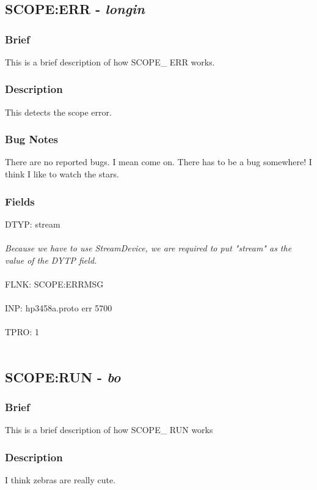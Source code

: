 \documentclass[12pt]{article}
\begin{document}
\section{}
\newpage
\subsection{SCOPE:ERR - \textit{longin}}
\subsubsection{Brief}
This is a brief description of how SCOPE\_ ERR works. \\
\subsubsection{Description}
This detects the scope error.
\subsubsection{Bug Notes}
There are no reported bugs. I mean come on. There has to be a bug somewhere! I think I like to watch the stars. 

\subsubsection{Fields}
DTYP: stream\\\\ \textit{Because we have to use StreamDevice, we are required to put "stream" as the value of the DYTP field.}\\\\ 
FLNK: SCOPE:ERRMSG\\\\ INP: hp3458a.proto err 5700\\\\ TPRO: 1\\\\ \newpage
\subsection{SCOPE:RUN - \textit{bo}}
\subsubsection{Brief}
This is a brief description of how SCOPE\_ RUN works 
\subsubsection{Description}
I think zebras are really cute.
\end{document}
